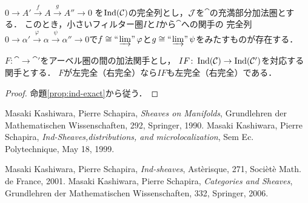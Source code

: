 \begin{Proposition}\label{prop:ind-exact}
    $0\to A'\overset{f}{\to}A\overset{g}{\to}A''\to 0$
    を$\mathop{\mathrm{Ind}}(\mathcal{C})$の完全列とし，$\mathcal{J}$を$\cat$の充満部分加法圏とする．
    このとき，小さいフィルター圏$I$と$I$から$\cat$への関手の
    完全列$0\to \alpha'
    \overset{\varphi}{\to}\alpha
    \overset{\psi}{\to}\alpha''\to 0$で$f\cong\mathop{\text{``}\hspace{-0.7pt}\varinjlim\hspace{-1.5pt}\text{''}}\varphi$と$g\cong\mathop{\text{``}\hspace{-0.7pt}\varinjlim\hspace{-1.5pt}\text{''}}\psi$をみたすものが存在する．
\end{Proposition}

\begin{comment}
\begin{Lemma}
    $I$を小さいフィルター圏，
    $\alpha\colon T\to \cat$を関手，
    $A=\limf\alpha$とし，
    $f\colon A\hookrightarrow B$を$\Ind(\cat)$における単射とする．
    このとき，小さいフィルター圏$K$と共終関手$p$
\end{Lemma}
\end{comment}

\begin{Corollary}
    $F\colon \cat\to\cat'$をアーベル圏の間の加法関手とし，
    $IF\colon\mathop{\mathrm{Ind}}(\mathcal{C})\to\mathop{\mathrm{Ind}}(\mathcal{C}')$を対応する関手とする．
    $F$が左完全（右完全）なら$IF$も左完全（右完全）である．
\end{Corollary}

\begin{proof}
    命題\ref{prop:ind-exact}から従う．
\end{proof}


















\begin{thebibliography}{20} 
     Masaki Kashiwara, Pierre Schapira, 
    \textit{Sheaves on Manifolds}, 
    Grundlehren der Mathematischen Wissenschaften, 292, Springer, 1990.
     Masaki Kashiwara, Pierre Schapira, 
    \textit{Ind-Sheaves,distributions, and microlocalization}, 
    Sem Ec. Polytechnique, May 18, 1999.
    
     Masaki Kashiwara, Pierre Schapira, 
    \textit{Ind-sheaves}, 
    Ast\`erisque, 271, Soci\`et\`e Math. de France, 2001.
     Masaki Kashiwara, Pierre Schapira, 
    \textit{Categories and Sheaves}, 
    Grundlehren der Mathematischen Wissenschaften, 332, Springer, 2006.
\end{thebibliography}




